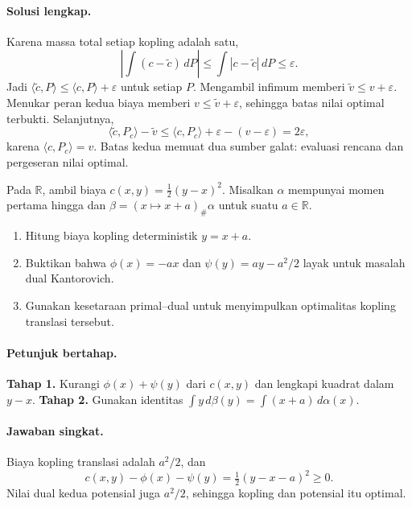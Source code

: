 \paragraph{Solusi lengkap.}
\label{orig03:ps06:solution:0001}
Karena massa total setiap kopling adalah satu,
\[
 \left|\int(c-\widetilde c)\,dP\right|
 \le\int|c-\widetilde c|\,dP\le\varepsilon.
\]
Jadi $\langle\widetilde c,P\rangle\le\langle c,P\rangle+\varepsilon$
untuk setiap $P$. Mengambil infimum memberi
$\widetilde v\le v+\varepsilon$. Menukar peran kedua biaya memberi
$v\le\widetilde v+\varepsilon$, sehingga batas nilai optimal terbukti.
Selanjutnya,
\[
 \langle\widetilde c,P_c\rangle-\widetilde v
 \le\langle c,P_c\rangle+\varepsilon-(v-\varepsilon)
 =2\varepsilon,
\]
karena $\langle c,P_c\rangle=v$. Batas kedua memuat dua sumber galat: evaluasi
rencana dan pergeseran nilai optimal.

\begin{exercise}
\label{orig03:ps06:exercise:0002}
Pada $\mathbb R$, ambil biaya
$c(x,y)=\tfrac12(y-x)^2$. Misalkan $\alpha$ mempunyai momen pertama hingga dan
$\beta=(x\mapsto x+a)_\#\alpha$ untuk suatu $a\in\mathbb R$.

\begin{enumerate}
  \item Hitung biaya kopling deterministik $y=x+a$.
  \item Buktikan bahwa
  $\phi(x)=-ax$ dan $\psi(y)=ay-a^2/2$ layak untuk masalah dual Kantorovich.
  \item Gunakan kesetaraan primal--dual untuk menyimpulkan optimalitas kopling
  translasi tersebut.
\end{enumerate}
\end{exercise}

\paragraph{Petunjuk bertahap.}
\label{orig03:ps06:hint:0002}
\textbf{Tahap 1.} Kurangi $\phi(x)+\psi(y)$ dari $c(x,y)$ dan lengkapi
kuadrat dalam $y-x$.
\textbf{Tahap 2.} Gunakan identitas
$\int y\,d\beta(y)=\int(x+a)\,d\alpha(x)$.

\paragraph{Jawaban singkat.}
\label{orig03:ps06:answer:0002}
Biaya kopling translasi adalah $a^2/2$, dan
\[
 c(x,y)-\phi(x)-\psi(y)=\tfrac12(y-x-a)^2\ge0.
\]
Nilai dual kedua potensial juga $a^2/2$, sehingga kopling dan potensial itu
optimal.

